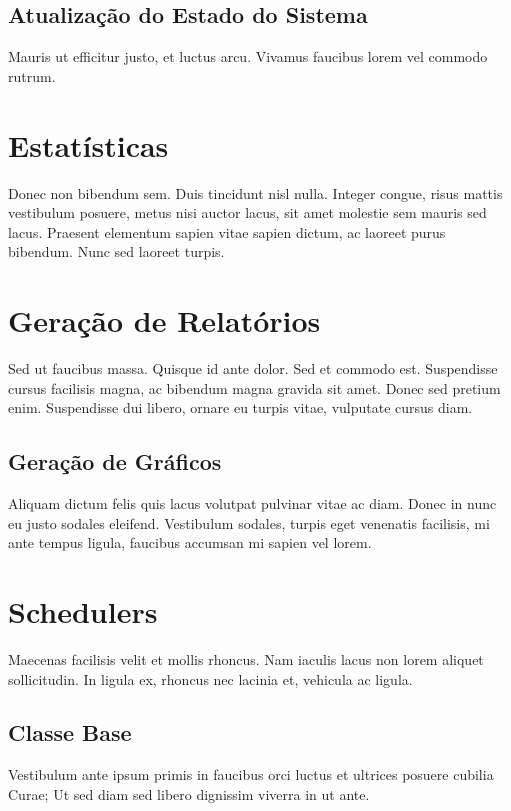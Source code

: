\subsection{Atualização do Estado do Sistema}

Mauris ut efficitur justo, et luctus arcu. Vivamus faucibus lorem vel commodo
rutrum.

\section{Estatísticas}

Donec non bibendum sem. Duis tincidunt nisl nulla. Integer congue, risus mattis
vestibulum posuere, metus nisi auctor lacus, sit amet molestie sem mauris sed
lacus. Praesent elementum sapien vitae sapien dictum, ac laoreet purus bibendum.
Nunc sed laoreet turpis.

\section{Geração de Relatórios}

Sed ut faucibus massa. Quisque id ante dolor. Sed et commodo est. Suspendisse
cursus facilisis magna, ac bibendum magna gravida sit amet. Donec sed pretium
enim. Suspendisse dui libero, ornare eu turpis vitae, vulputate cursus diam.

\subsection{Geração de Gráficos}

Aliquam dictum felis quis lacus volutpat pulvinar vitae ac diam. Donec in nunc
eu justo sodales eleifend. Vestibulum sodales, turpis eget venenatis facilisis,
mi ante tempus ligula, faucibus accumsan mi sapien vel lorem.

\section{Schedulers}

Maecenas facilisis velit et mollis rhoncus. Nam iaculis lacus non lorem aliquet
sollicitudin. In ligula ex, rhoncus nec lacinia et, vehicula ac ligula.

\subsection{Classe Base}

Vestibulum ante ipsum primis in faucibus orci luctus et ultrices posuere cubilia
Curae; Ut sed diam sed libero dignissim viverra in ut ante.

